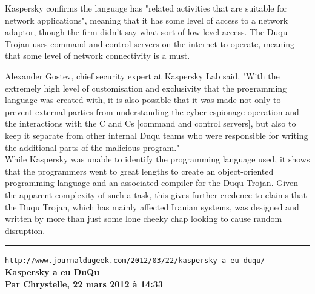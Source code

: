 \documentclass[11pt,twoside,a4paper]{article}
\begin{document}
Kaspersky confirms the language has "related activities that are suitable for network applications", meaning that it has some level of access to a network adaptor, though the firm didn't say what sort of low-level access. The Duqu Trojan uses command and control servers on the internet to operate, meaning that some level of network connectivity is a must.~\\

\clearpage %

Alexander Gostev, chief security expert at Kaspersky Lab said, "With the extremely high level of customisation and exclusivity that the programming language was created with, it is also possible that it was made not only to prevent external parties from understanding the cyber-espionage operation and the interactions with the C and Cs [command and control servers], but also to keep it separate from other internal Duqu teams who were responsible for writing the additional parts of the malicious program."~\\

While Kaspersky was unable to identify the programming language used, it shows that the programmers went to great lengths to create an object-oriented programming language and an associated compiler for the Duqu Trojan. Given the apparent complexity of such a task, this gives further credence to claims that the Duqu Trojan, which has mainly affected Iranian systems, was designed and written by more than just some lone cheeky chap looking to cause random disruption. %

\rule{\textwidth}{0.01cm} %

\texttt{http://www.journaldugeek.com/2012/03/22/kaspersky-a-eu-duqu/}~\\

\textbf{\LARGE Kaspersky a eu DuQu}~\\

\textbf{\small Par Chrystelle, 22 mars 2012 {\`a} 14:33}~\\
\end{document}
